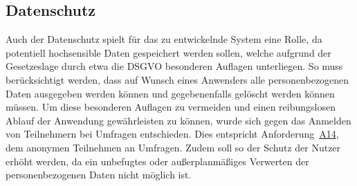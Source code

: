 \subsection{Datenschutz}
Auch der Datenschutz spielt für das zu entwickelnde System eine Rolle, da potentiell hochsensible Daten gespeichert werden sollen, welche aufgrund der Gesetzeslage durch etwa die \ac{DSGVO}\autocite{rf-dsgvo} besonderen Auflagen unterliegen.
So muss berücksichtigt werden, dass auf Wunsch eines Anwenders alle personenbezogenen Daten ausgegeben werden können und gegebenenfalls gelöscht werden können müssen.
Um diese besonderen Auflagen zu vermeiden und einen reibungslosen Ablauf der Anwendung gewährleisten zu können, wurde sich gegen das Anmelden von Teilnehmern bei Umfragen entschieden.
Dies entspricht Anforderung~\hyperref[Anf:A14]{A14}, dem anonymen Teilnehmen an Umfragen.
Zudem soll so der Schutz der Nutzer erhöht werden, da ein unbefugtes oder außerplanmäßiges Verwerten der personenbezogenen Daten nicht möglich ist.
